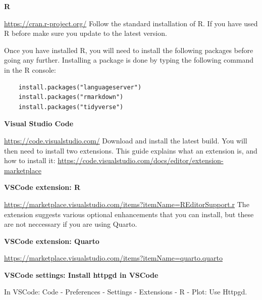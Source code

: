 \documentclass[
  letterpaper,
  DIV=11,
  numbers=noendperiod]{scrreprt}
\begin{document}
\textbf{R}

\url{https://cran.r-project.org/} Follow the standard installation of R.
If you have used R before make sure you update to the latest version.

Once you have installed R, you will need to install the following
packages before going any further. Installing a package is done by
typing the following command in the R console:

\begin{verbatim}
    install.packages("languageserver")
    install.packages("rmarkdown")
    install.packages("tidyverse")
\end{verbatim}

\textbf{Visual Studio Code}

\url{https://code.visualstudio.com/} Download and install the latest
build. You will then need to install two extensions. This guide explains
what an extension is, and how to install it:
\url{https://code.visualstudio.com/docs/editor/extension-marketplace}

\textbf{VSCode extension: R}

\url{https://marketplace.visualstudio.com/items?itemName=REditorSupport.r}
The extension suggests various optional enhancements that you can
install, but these are not neccessary if you are using Quarto.

\textbf{VSCode extension: Quarto}

\url{https://marketplace.visualstudio.com/items?itemName=quarto.quarto}

\textbf{VSCode settings: Install httpgd in VSCode}

In VSCode: Code - Preferences - Settings - Extensions - R - Plot: Use
Httpgd.
\end{document}
